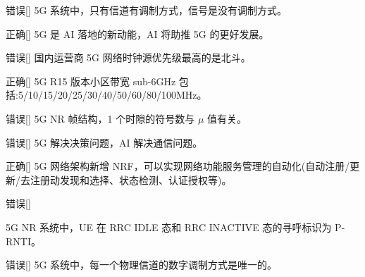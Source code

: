 \begin{choice}{\;错误\;}[]
    5G 系统中，只有信道有调制方式，信号是没有调制方式。
\end{choice}

\begin{choice}{\;正确\;}[]
    5G 是 AI 落地的新动能，AI 将助推 5G 的更好发展。
\end{choice}

\begin{choice}{\;错误\;}[]
    国内运营商 5G 网络时钟源优先级最高的是北斗。
\end{choice}

\begin{choice}{\;正确\;}[]
    5G R15 版本小区带宽 sub-6GHz 包括:5/10/15/20/25/30/40/50/60/80/100MHz。
\end{choice}

\begin{choice}{\;错误\;}[]
    5G NR 帧结构，1 个时隙的符号数与 $\mu $ 值有关。

\end{choice}


\begin{choice}{\;错误\;}[]
    5G 解决决策问题，AI 解决通信问题。

\end{choice}

\begin{choice}{\;正确\;}[]
    5G 网络架构新增 NRF，可以实现网络功能服务管理的自动化(自动注册/更新/去注册动发现和选择、状态检测、认证授权等)。

\end{choice}

\begin{choice}{\;错误\;}[]

    5G NR 系统中，UE 在 RRC IDLE 态和 RRC INACTIVE 态的寻呼标识为 P-RNTI。
\end{choice}


\begin{choice}{\;错误\;}[]
    5G 系统中，每一个物理信道的数字调制方式是唯一的。

\end{choice}

